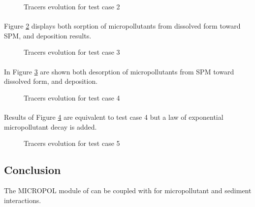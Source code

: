 \begin{figure} [H]
\centering
{}
 \caption{Tracers evolution for test case 2}
 \label{fig:waq3d_micropol:sed}
\end{figure}

\paragraph{}
Figure \ref{fig:waq3d_micropol:sorp_desorp} displays both sorption of micropollutants
from dissolved form toward SPM, and deposition results.

\begin{figure} [H]
\centering
{}
\caption{Tracers evolution for test case 3}
 \label{fig:waq3d_micropol:sorp_desorp}
\end{figure}

\paragraph{}
In Figure \ref{fig:waq3d_micropol:sed_desorp} are shown both desorption
of micropollutants from SPM toward dissolved form, and deposition.

\begin{figure} [H]
\centering
{}
 \caption{Tracers evolution for test case 4}
 \label{fig:waq3d_micropol:sed_desorp}
\end{figure}

\paragraph{}
Results of Figure \ref{fig:waq2d_micropol:sed_desorp_decay} are equivalent to test
case 4 but a law of exponential micropollutant decay is added.

\begin{figure} [H]
\centering
{}
 \caption{Tracers evolution for test case 5}
 \label{fig:waq2d_micropol:sed_desorp_decay}
\end{figure}

\subsection{Conclusion}

The MICROPOL module of \waqtel can be coupled with  for micropollutant and sediment interactions.

